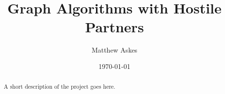 \documentclass[11pt
              , a4paper
              , twoside
              , openright
              ]{book}
\title{Graph Algorithms with Hostile Partners}
\author{Matthew Askes}
\date{\today}
\theoremstyle{definition}
\begin{document}
\frontmatter

\begin{abstract}

A short description of the project goes here.

\end{abstract}

\maketitle

%
\tableofcontents



\mainmatter








\backmatter


\end{document}
